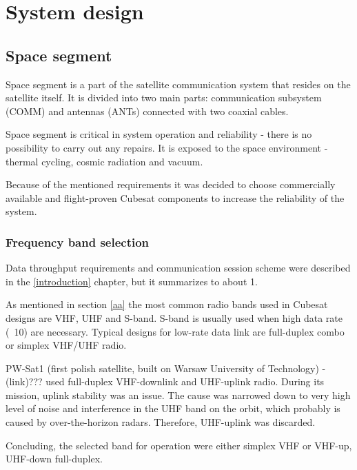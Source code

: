 \part{System design}



\chapter{Space segment}
Space segment is a part of the satellite communication system that resides on the satellite itself. It is divided into two main parts: communication subsystem (COMM) and antennas (ANTs) connected with two coaxial cables.

Space segment is critical in system operation and reliability - there is no possibility to carry out any repairs. It is exposed to the space environment - thermal cycling, cosmic radiation and vacuum.

Because of the mentioned requirements it was decided to choose commercially available and flight-proven Cubesat components to increase the reliability of the system.

\section{Frequency band selection}
Data throughput requirements and communication session scheme were described in the \ref{introduction} chapter, but it summarizes to about \SI{1}{\kbps}.

As mentioned in section \ref{aa} the most common radio bands used in Cubesat designs are VHF, UHF and S-band. S-band is usually used when high data rate (~\SI{10}{\Mbps}) are necessary. Typical designs for low-rate data link are full-duplex combo or simplex VHF/UHF radio.

PW-Sat1 (first polish satellite, built on Warsaw University of Technology) - (link)??? used full-duplex VHF-downlink and UHF-uplink radio. During its mission, uplink stability was an issue. The cause was narrowed down to very high level of noise and interference in the UHF band on the orbit, which probably is caused by over-the-horizon radars. Therefore, UHF-uplink was discarded.

Concluding, the selected band for operation were either simplex VHF or VHF-up, UHF-down full-duplex.

